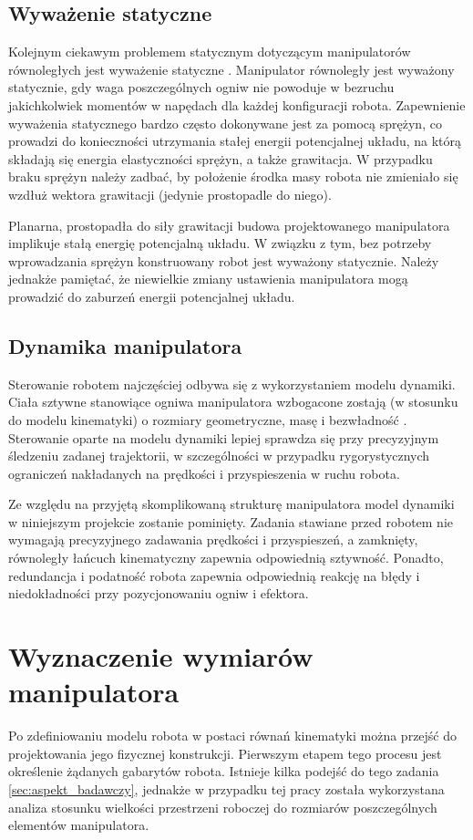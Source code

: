 \documentclass[printmode]{mgr}
\begin{document}
\section{Wyważenie statyczne}
Kolejnym ciekawym problemem statycznym dotyczącym manipulatorów równoległych jest wyważenie statyczne \cite{handbook}.
Manipulator równoległy jest wyważony statycznie, gdy waga poszczególnych ogniw nie powoduje w bezruchu jakichkolwiek 
momentów w napędach dla każdej konfiguracji robota. Zapewnienie wyważenia statycznego bardzo często dokonywane jest za pomocą
sprężyn, co prowadzi do konieczności utrzymania stałej energii potencjalnej układu, na którą składają się energia elastyczności sprężyn, 
a także grawitacja. W przypadku braku sprężyn należy zadbać, by położenie środka masy robota nie zmieniało się wzdłuż wektora
grawitacji (jedynie prostopadle do niego).

Planarna, prostopadła do siły grawitacji budowa projektowanego manipulatora implikuje stałą energię potencjalną układu. W związku z tym,
bez potrzeby wprowadzania sprężyn konstruowany robot jest wyważony statycznie. Należy jednakże pamiętać, że niewielkie
zmiany ustawienia manipulatora mogą prowadzić do zaburzeń energii potencjalnej układu.

\section{Dynamika manipulatora}
Sterowanie robotem najczęściej odbywa się z wykorzystaniem modelu dynamiki. Ciała sztywne stanowiące ogniwa
manipulatora wzbogacone zostają (w stosunku do modelu kinematyki) o rozmiary geometryczne, masę i bezwładność \cite{podstawy_robotyki}.
Sterowanie oparte na modelu dynamiki lepiej sprawdza się przy precyzyjnym śledzeniu zadanej trajektorii, w szczególności
w przypadku rygorystycznych ograniczeń nakładanych na prędkości i przyspieszenia w ruchu robota. 

Ze względu na przyjętą skomplikowaną strukturę manipulatora model dynamiki w niniejszym projekcie zostanie pominięty. Zadania stawiane
przed robotem nie wymagają precyzyjnego zadawania prędkości i przyspieszeń, a zamknięty, równoległy łańcuch kinematyczny
zapewnia odpowiednią sztywność. Ponadto, redundancja i podatność robota zapewnia odpowiednią reakcję na błędy i niedokładności
przy pozycjonowaniu ogniw i efektora.


\chapter{Wyznaczenie wymiarów manipulatora}\label{sec:wyznaczenie_wymiarow_manipulatora}
Po zdefiniowaniu modelu robota w postaci równań kinematyki można przejść do projektowania
jego fizycznej konstrukcji. Pierwszym etapem tego procesu jest określenie żądanych gabarytów
robota. Istnieje kilka podejść do tego zadania \ref{sec:aspekt_badawczy}, jednakże w przypadku tej pracy została
wykorzystana analiza stosunku wielkości przestrzeni roboczej do rozmiarów poszczególnych
elementów manipulatora.
\end{document}
